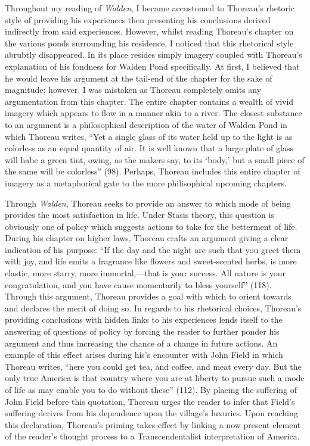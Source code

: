 \documentclass[12pt]{article}
\newcommand{\tq}[2]{
    \fancyhead[L]{\emph{Walden}: Reading Journals}
    \fancyhead[R]{TQ:\ #1 $\vert$ CH: #2}
}
\begin{document}
Throughout my reading of \emph{Walden}, I became accustomed to Thoreau's rhetoric style of providing his experiences then presenting his conclusions derived indirectly from said experiences. However, whilst reading Thoreau's chapter on the various ponds surrounding his residence, I noticed that this rhetorical style abrubtly disappeared. In its place resides simply imagery coupled with Thoreau's explanation of his fondness for Walden Pond specifically. At first, I believed that he would leave his argument at the tail-end of the chapter for the sake of magnitude; however, I was mistaken as Thoreau completely omits any argumentation from this chapter. The entire chapter contains a wealth of vivid imagery which appears to flow in a manner akin to a river. The closest substance to an argument is a philosophical description of the water of Walden Pond in which Thoreau writes, ``Yet a single glass of its water held up to the light is as colorless as an equal quantity of air. It is well known that a large plate of glass will habe a green tint, owing, as the makers say, to its `body,' but a small piece of the same will be colorless'' (98). Perhaps, Thoreau includes this entire chapter of imagery as a metaphorical gate to the more philisophical upcoming chapters.

\newpage
\tq{7}{10 \& 11 - Baker Farm and Higher Laws}


Through \emph{Walden}, Thoreau seeks to provide an answer to which mode of being provides the most satisfaction in life. Under Stasis theory, this question is obviously one of policy which suggests actions to take for the betterment of life. During his chapter on higher laws, Thoreau crafts an argument giving a clear indication of his purpose: ``If the day and the night are such that you greet them with joy, and life emits a fragrance like flowers and sweet-scented herbs, is more elastic, more starry, more immortal,—that is your success. All nature is your congratulation, and you have cause momentarily to bless yourself'' (118). Through this argument, Thoreau provides a goal with which to orient towards and declares the merit of doing so. In regards to his rhetorical choices, Thoreau's providing conclusions with hidden links to his experiences lends itself to the answering of questions of policy by forcing the reader to further ponder his argument and thus increasing the chance of a change in future actions. An example of this effect arises during his's encounter with John Field in which Thoreau writes, ``here you could get tea, and coffee, and meat every day. But the only true America is that country where you are at liberty to pursue such a mode of life as may enable you to do without these'' (112). By placing the suffering of John Field before this quotation, Thoreau urges the reader to infer that Field's suffering derives from his dependence upon the village's luxuries. Upon reaching this declaration, Thoreau's priming takes effect by linking a now present element of the reader's thought process to a Transcendentalist interpretation of America.
\end{document}
